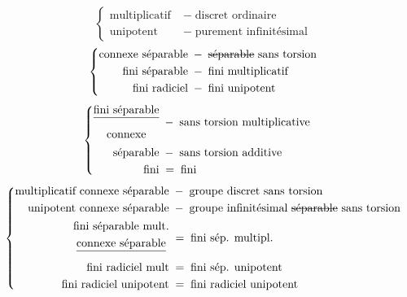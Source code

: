 \[
\left\{\begin{aligned}
\text{multiplicatif}&\; -\;\text{discret ordinaire}\\
\text{unipotent}&\; -\;\text{purement infinitésimal}
\end{aligned}\right.
\]
\[
\left\{\begin{aligned}
\text{connexe séparable}&\; -\;\deleted{\text{séparable}}\ \text{sans torsion}\\
\text{fini séparable}&\; -\;\text{fini multiplicatif}\\
\text{fini radiciel}&\; -\;\text{fini unipotent}
\end{aligned}\right.
\]
\[
\left\{\begin{aligned}
\begin{gathered}\deleted{\text{fini séparable}}\\\text{connexe}\end{gathered}&\; -\;\text{sans torsion multiplicative}\\
\text{séparable}&\; -\;\text{sans torsion additive}\\
\text{fini}&\; =\;\text{fini}
\end{aligned}\right.
\]
\[
\left\{\begin{aligned}
\text{multiplicatif connexe séparable}&\; -\;\text{groupe discret sans torsion}\\
\text{unipotent connexe séparable}&\; -\;\text{groupe infinitésimal \deleted{séparable} sans torsion}\\
\begin{gathered}\text{fini séparable mult.}\\\deleted{\text{connexe séparable}}\end{gathered}&\; =\;\text{fini sép. multipl.}\\
\text{fini radiciel mult}&\; =\;\text{fini sép. unipotent}\\
\text{fini radiciel unipotent}&\; =\;\text{fini radiciel unipotent}
\end{aligned}\right.
\]

